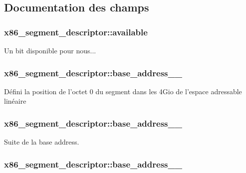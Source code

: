 \subsection{Documentation des champs}
\hypertarget{structx86__segment__descriptor_a761494a7a460e493e0d5d188a31cd052}{
\subsubsection[{available}]{ x86\-\_\-segment\-\_\-descriptor\-::available}}\label{structx86__segment__descriptor_a761494a7a460e493e0d5d188a31cd052}
Un bit disponible pour nous... \hypertarget{structx86__segment__descriptor_a6cd0f49e21060fadba677c3b41685ebf}{
\subsubsection[{base\-\_\-address\-\_\-15\-\_\-0}]{ x86\-\_\-segment\-\_\-descriptor\-::base\-\_\-address\-\_\-\_}}\label{structx86__segment__descriptor_a6cd0f49e21060fadba677c3b41685ebf}
Défini la position de l'octet 0 du segment dans les 4\-Gio de l'espace adressable linéaire \hypertarget{structx86__segment__descriptor_a95889fcbabf116ba15a6cea3364b903d}{
\subsubsection[{base\-\_\-address\-\_\-23\-\_\-16}]{ x86\-\_\-segment\-\_\-descriptor\-::base\-\_\-address\-\_\-\_}}\label{structx86__segment__descriptor_a95889fcbabf116ba15a6cea3364b903d}
Suite de la base address. \hypertarget{structx86__segment__descriptor_af839dd21992c16573ea5b816b72f249f}{
\subsubsection[{base\-\_\-address\-\_\-31\-\_\-24}]{ x86\-\_\-segment\-\_\-descriptor\-::base\-\_\-address\-\_\-\_}}\label{structx86__segment__descriptor_af839dd21992c16573ea5b816b72f249f}
